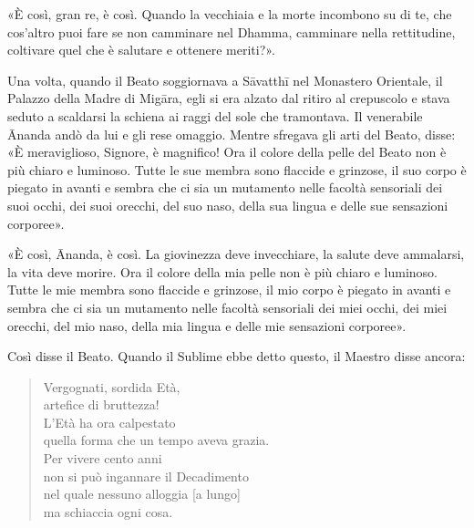 «È così, gran re, è così. Quando la vecchiaia e la morte incombono su di te, che
cos’altro puoi fare se non camminare nel Dhamma, camminare nella rettitudine,
coltivare quel che è salutare e ottenere meriti?».


Una volta, quando il Beato soggiornava a Sāvatthī nel Monastero Orientale, il
Palazzo della Madre di Migāra, egli si era alzato dal ritiro al crepuscolo e
stava seduto a scaldarsi la schiena ai raggi del sole che tramontava. Il
venerabile Ānanda andò da lui e gli rese omaggio. Mentre sfregava gli arti del
Beato, disse: «È meraviglioso, Signore, è magnifico! Ora il colore della pelle
del Beato non è più chiaro e luminoso. Tutte le sue membra sono flaccide e
grinzose, il suo corpo è piegato in avanti e sembra che ci sia un mutamento
nelle facoltà sensoriali dei suoi occhi, dei suoi orecchi, del suo naso, della
sua lingua e delle sue sensazioni corporee».

«È così, Ānanda, è così. La giovinezza deve invecchiare, la salute deve
ammalarsi, la vita deve morire. Ora il colore della mia pelle non è più chiaro e
luminoso. Tutte le mie membra sono flaccide e grinzose, il mio corpo è piegato
in avanti e sembra che ci sia un mutamento nelle facoltà sensoriali dei miei
occhi, dei miei orecchi, del mio naso, della mia lingua e delle mie sensazioni
corporee».

Così disse il Beato. Quando il Sublime ebbe detto questo, il Maestro disse
ancora:

\begin{quote}
Vergognati, sordida Età, \\
artefice di bruttezza! \\
L’Età ha ora calpestato \\
quella forma che un tempo aveva grazia. \\
Per vivere cento anni \\
non si può ingannare il Decadimento \\
nel quale nessuno alloggia [a lungo] \\
ma schiaccia ogni cosa.
\end{quote}


